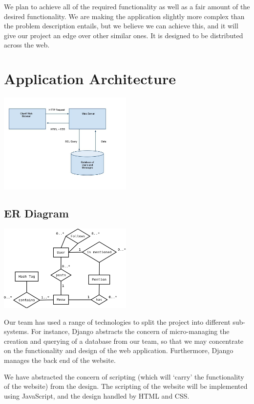 \documentclass{sig-alt-release2}
\begin{document}
We plan to achieve all of the required functionality as well as a fair amount of the desired functionality. We are making the application slightly more complex than the problem description entails, but we believe we can achieve this, and it will give our project an edge over other similar ones. It is designed to be distributed across the web.

\section{Application Architecture}

\includegraphics[width=250px]{images/architecture.jpg}

\subsection{ER Diagram}

\includegraphics[width=250px]{images/erdiagram.png}

Our team has used a range of technologies to split the project into different sub-systems. For instance, Django abstracts the concern of micro-managing the creation and querying of a database from our team, so that we may concentrate on the functionality and design of the web application. Furthermore, Django manages the back end of the website. 

We have abstracted the concern of scripting (which will `carry' the functionality of the website) from the design. The scripting of the website will be implemented using JavaScript, and the design handled by HTML and CSS.
\end{document}

